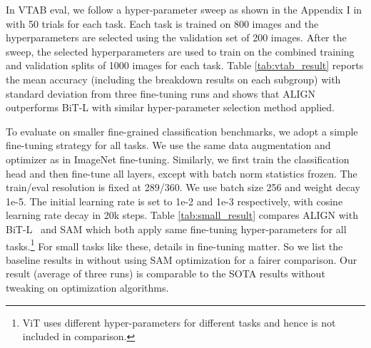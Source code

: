 \documentclass{article}
\begin{document}
In VTAB eval, we follow a hyper-parameter sweep as shown in the Appendix I in \cite{zhai:vtab} with 50 trials for each task. Each task is trained on 800 images and the hyperparameters are selected using the validation set of 200 images. After the sweep, the selected hyperparameters are used to train on the combined training and validation splits of 1000 images for each task. Table \ref{tab:vtab_result} reports the mean accuracy (including the breakdown results on each subgroup) with standard deviation from three fine-tuning runs and shows that ALIGN outperforms BiT-L \cite{kolensnikov:bit} with similar hyper-parameter selection method applied.

\begin{table}[h!]
\vspace{-3mm}
\begin{center}
\caption{VTAB (19 tasks) comparison between ALIGN and BiT-L.}
\label{tab:vtab_result}
\vskip -0.1in
\label{tab:vtab}
\begin{small}
\end{small}
\end{center}
\vspace{-3mm}
\end{table}

To evaluate on smaller fine-grained classification benchmarks, we adopt a simple fine-tuning strategy for all tasks. We use the same data augmentation and optimizer as in ImageNet fine-tuning. Similarly, we first train the classification head and then fine-tune all layers, except with batch norm statistics frozen. The train/eval resolution is fixed at 289/360. We use batch size 256 and weight decay 1e-5. The initial learning rate is set to 1e-2 and 1e-3 respectively, with cosine learning rate decay in 20k steps. Table \ref{tab:small_result} compares ALIGN with BiT-L~\cite{kolensnikov:bit} and SAM \cite{foret:sam} which both apply same fine-tuning hyper-parameters for all tasks.\footnote{ViT \cite{dosovitskiy:vit} uses different hyper-parameters for different tasks and hence is not included in comparison.} For small tasks like these, details in fine-tuning matter. So we list the baseline results in \cite{foret:sam} without using SAM optimization for a fairer comparison. Our result (average of three runs) is comparable to the SOTA results without tweaking on optimization algorithms.
\end{document}
